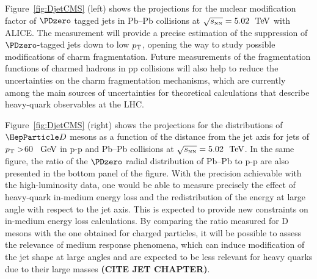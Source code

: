 Figure~\ref{fig:DjetCMS} (left) shows the projections for the nuclear modification factor of $\PDzero$ tagged jets in Pb--Pb collisions at $\sqrt{s_{\scriptscriptstyle \rm NN}}=5.02~{~\text{TeV}}$ with ALICE. The measurement will provide a precise estimation of the suppression of $\PDzero$-tagged jets down to low $p_{\rm T}$, opening the way to study possible modifications of charm fragmentation. Future measurements of the fragmentation functions of charmed hadrons in pp collisions will also help to reduce the uncertainties on the charm fragmentation mechanisms, which are currently among the main sources of uncertainties for theoretical calculations that describe heavy-quark observables at the LHC. 

Figure~\ref{fig:DjetCMS} (right) shows the projections for the distributions of $\PD$ mesons as a function of the distance from the jet axis for jets of $p_{\rm T}>$60~$~\text{GeV}$ in p-p and Pb--Pb collisions at $\sqrt{s_{\scriptscriptstyle \rm NN}}=5.02~{~\text{TeV}}$. In the same figure, the ratio of the $\PDzero$ radial distribution of Pb--Pb to p-p are also presented in the bottom panel of the figure. With the precision achievable with the high-luminosity data, one would be able to measure precisely the effect of heavy-quark in-medium energy loss and the redistribution of the energy at large angle with respect to the jet axis. This is expected to provide new constraints on in-medium energy loss calculations. By comparing the ratio measured for D mesons with the one obtained for charged particles, it will be possible to assess the relevance of medium response phenomena, which can induce modification of the jet shape at large angles and are expected to be less relevant for heavy quarks due to their large masses \textbf{(CITE JET CHAPTER)}.


